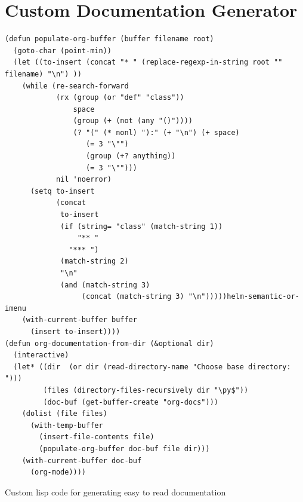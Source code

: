 \documentclass[11pt]{report}
\begin{document}
\section{Custom Documentation Generator}
\label{sec:orga9dc9b8}
\begin{listing}[htbp]
\begin{verbatim}
(defun populate-org-buffer (buffer filename root)
  (goto-char (point-min))
  (let ((to-insert (concat "* " (replace-regexp-in-string root "" filename) "\n") ))
    (while (re-search-forward
            (rx (group (or "def" "class"))
                space
                (group (+ (not (any "()"))))
                (? "(" (* nonl) "):" (+ "\n") (+ space)
                   (= 3 "\"")
                   (group (+? anything))
                   (= 3 "\"")))
            nil 'noerror)
      (setq to-insert
            (concat
             to-insert
             (if (string= "class" (match-string 1))
                 "** "
               "*** ")
             (match-string 2)
             "\n"
             (and (match-string 3)
                  (concat (match-string 3) "\n")))))helm-semantic-or-imenu
    (with-current-buffer buffer
      (insert to-insert))))
(defun org-documentation-from-dir (&optional dir)
  (interactive)
  (let* ((dir  (or dir (read-directory-name "Choose base directory: ")))
         (files (directory-files-recursively dir "\py$"))
         (doc-buf (get-buffer-create "org-docs")))
    (dolist (file files)
      (with-temp-buffer
        (insert-file-contents file)
        (populate-org-buffer doc-buf file dir)))
    (with-current-buffer doc-buf
      (org-mode))))
\end{verbatim}
\caption{\label{orgd0f3650}
Custom lisp code for generating easy to read documentation}
\end{listing}

\clearpage
\end{document}
